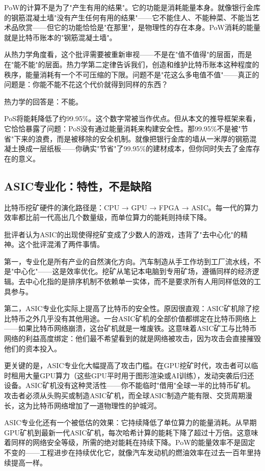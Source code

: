 \documentclass[a4paper,12pt,openany]{ctexbook}
\begin{document}
PoW的计算不是为了"产生有用的结果"。它的功能是消耗能量本身。就像银行金库的钢筋混凝土墙"没有产生任何有用的结果"——它不能住人、不能种菜、不能当艺术品欣赏——但它的功能恰恰是"在那里"，是物理性的存在本身。PoW消耗的能量就是比特币账本的"钢筋混凝土墙"。

从热力学角度看，这个批评需要被重新审视——不是在"值不值得"的层面，而是在"能不能"的层面。热力学第二定律告诉我们，创造和维护比特币账本这种程度的秩序，能量消耗有一个不可压缩的下限。问题不是"花这么多电值不值"——真正的问题是：你能不能不花这个代价就得到同样的东西？

热力学的回答是：不能。

PoS将能耗降低了约99.95\%。这个数字常被当作优点。但从本文的推导框架来看，它恰恰暴露了问题：PoS没有通过能量消耗来构建安全性。那99.95\%不是被"节省"下来的浪费，而是被移除的安全机制。就像把银行金库的墙从一米厚的钢筋混凝土换成一层纸板——你确实"节省"了99.95\%的建材成本，但你同时失去了金库存在的意义。


\subsection*{ASIC专业化：特性，不是缺陷}


比特币挖矿硬件的演化路径是：CPU → GPU → FPGA → ASIC。每一代的算力效率都比前一代高出几个数量级，而单位算力的能耗则持续下降。

批评者认为ASIC的出现使得挖矿变成了少数人的游戏，违背了"去中心化"的精神。这个批评混淆了两件事情。

第一，专业化是所有产业的自然演化方向。汽车制造从手工作坊到工厂流水线，不是"中心化"——这是效率优化。挖矿从笔记本电脑到专用矿场，遵循同样的经济逻辑。去中心化指的是排序机制不依赖单一实体，而不是要求所有人用同样低效的工具参与。

第二，ASIC专业化实际上提高了比特币的安全性。原因很直观：ASIC矿机除了挖比特币之外几乎没有其他用途。一台ASIC矿机的全部价值都绑定在比特币网络上——如果比特币网络崩溃，这台矿机就是一堆废铁。这意味着ASIC矿工与比特币网络的利益高度绑定：他们最不希望看到的就是网络被攻击，因为攻击会直接摧毁他们的资本投入。

更关键的是，ASIC专业化大幅提高了攻击门槛。在GPU挖矿时代，攻击者可以临时租用大量GPU算力（这些GPU平时用于图形渲染或AI训练），发动突袭后归还设备。ASIC矿机没有这种灵活性——你不能临时"借用"全球一半的比特币矿机。攻击者必须从头购买或制造ASIC矿机，而全球ASIC制造产能有限、交货周期漫长，这为比特币网络增加了一道物理性的护城河。

ASIC专业化还有一个被低估的效果：它持续降低了单位算力的能量消耗。从早期GPU矿机到最新一代ASIC矿机，每次哈希计算的能耗下降了超过十万倍。这意味着同样的网络安全等级，所需的绝对能耗在持续下降。PoW的能量效率不是固定不变的——工程进步在持续优化它，就像汽车发动机的燃油效率在过去一百年里持续提高一样。
\end{document}

